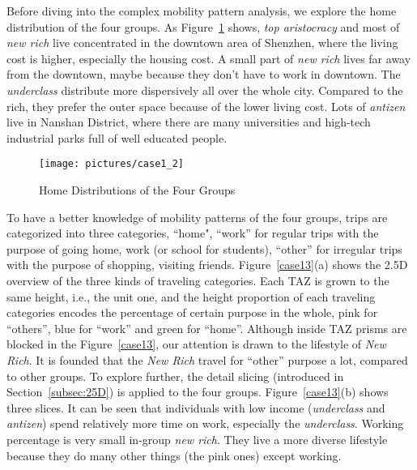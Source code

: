 Before diving into the complex mobility pattern analysis, we explore the home distribution of the four groups. As Figure~\ref{case12} shows, \textit{top aristocracy} and most of \textit{new rich} live concentrated in the downtown area of Shenzhen, where the living cost is higher, especially the housing cost. A small part of \textit{new rich} lives far away from the downtown, maybe because they don't have to work in downtown. The \textit{underclass} distribute more dispersively all over the whole city. Compared to the rich, they prefer the outer space because of the lower living cost. Lots of \textit{antizen} live in Nanshan District, where there are many universities and high-tech industrial parks full of well educated people.

\begin{figure}[htb!]
 \centering %
 \texttt{[image: pictures/case1\_2]}
 \caption{Home Distributions of the Four Groups}
 \label{case12}
\end{figure}


To have a better knowledge of mobility patterns of the four groups, trips are categorized into three categories, ``home", ``work'' for regular trips with the purpose of going home, work (or school for students), ``other'' for irregular trips with the purpose of shopping, visiting friends. Figure~\ref{case13}(a) shows the 2.5D overview of the three kinds of traveling categories. Each TAZ is grown to the same height, i.e., the unit one, and the height proportion of each traveling categories encodes the percentage of certain purpose in the whole, pink for ``others'', blue for ``work'' and green for ``home''. Although inside TAZ prisms are blocked in the Figure~\ref{case13}, our attention is drawn to the lifestyle of \textit{New Rich}. It is founded that the \textit{New Rich} travel for ``other'' purpose a lot, compared to other groups. To explore further, the detail slicing (introduced in Section~\ref{subsec:25D}) is applied to the four groups. Figure~\ref{case13}(b) shows three slices. It can be seen that individuals with low income (\textit{underclass} and \textit{antizen}) spend relatively more time on work, especially the \textit{underclass}. Working percentage is very small in-group \textit{new rich}. They live a more diverse lifestyle because they do many other things (the pink ones) except working.


